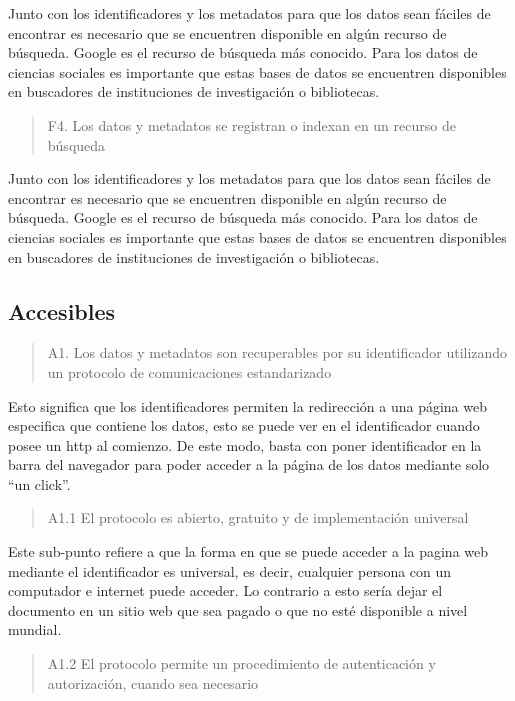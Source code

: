\documentclass[
  14pt,
]{book}
\begin{document}
Junto con los identificadores y los metadatos para que los datos sean fáciles de encontrar es necesario que se encuentren disponible en algún recurso de búsqueda. Google es el recurso de búsqueda más conocido. Para los datos de ciencias sociales es importante que estas bases de datos se encuentren disponibles en buscadores de instituciones de investigación o bibliotecas.

\begin{quote}
F4. Los datos y metadatos se registran o indexan en un recurso de búsqueda
\end{quote}

Junto con los identificadores y los metadatos para que los datos sean fáciles de encontrar es necesario que se encuentren disponible en algún recurso de búsqueda. Google es el recurso de búsqueda más conocido. Para los datos de ciencias sociales es importante que estas bases de datos se encuentren disponibles en buscadores de instituciones de investigación o bibliotecas.

\hypertarget{accesibles}{%
\subsection{\texorpdfstring{\textbf{Accesibles}}{Accesibles}}\label{accesibles}}

\begin{quote}
A1. Los datos y metadatos son recuperables por su identificador utilizando un protocolo de comunicaciones estandarizado
\end{quote}

Esto significa que los identificadores permiten la redirección a una página web especifica que contiene los datos, esto se puede ver en el identificador cuando posee un http al comienzo. De este modo, basta con poner identificador en la barra del navegador para poder acceder a la página de los datos mediante solo ``un click''.

\begin{quote}
A1.1 El protocolo es abierto, gratuito y de implementación universal
\end{quote}

Este sub-punto refiere a que la forma en que se puede acceder a la pagina web mediante el identificador es universal, es decir, cualquier persona con un computador e internet puede acceder. Lo contrario a esto sería dejar el documento en un sitio web que sea pagado o que no esté disponible a nivel mundial.

\begin{quote}
A1.2 El protocolo permite un procedimiento de autenticación y autorización, cuando sea necesario
\end{quote}
\end{document}
